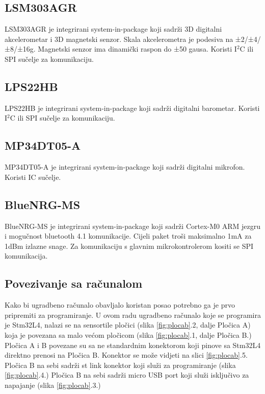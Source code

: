 \documentclass[times, utf8, diplomski]{diplomski}
\begin{document}
\subsection{LSM303AGR}
LSM303AGR je integrirani system-in-package koji sadrži 3D digitalni akcelerometar i 3D magnetski senzor. Skala akcelerometra je podesiva na
±2/±4/±8/±16g. Magnetski senzor ima dinamički raspon do ±50 gausa. Koristi I\(^2\)C ili SPI sučelje za komunikaciju.

\subsection{LPS22HB}
LPS22HB je integrirani system-in-package koji sadrži digitalni barometar. Koristi I\(^2\)C ili SPI sučelje za komunikaciju.

\subsection{MP34DT05-A}
MP34DT05-A je integrirani system-in-package koji sadrži digitalni mikrofon. Koristi IC sučelje.

\subsection{BlueNRG-MS}
BlueNRG-MS\cite{BlueNrgMs} je integrirani system-in-package koji sadrži Cortex-M0 ARM jezgru i mogučnost bluetooth 4.1 komunikacije.
Cijeli paket troši maksimalno 1mA za 1dBm izlazne snage. Za komunikaciju s glavnim mikrokontrolerom kositi se SPI komunikacija.

\subsection{Povezivanje sa računalom}
Kako bi ugradbeno računalo obavljalo koristan posao potrebno ga je prvo pripremiti za programiranje. U ovom radu ugradbeno računalo koje se programira je Stm32L4, nalazi se na sensortile pločici (slika \ref{fig:plocab}.2, dalje Pločica A) koja je povezana sa malo većom pločicom (slika \ref{fig:plocab}.1, dalje Pločica B.) Pločica A i B povezane su sa ne standardnim konektorom koji pinove sa Stm32L4 direktno prenosi na Pločica B. Konektor se može vidjeti na slici \ref{fig:plocab}.5. Pločica B na sebi sadrži st link\cite{stlink} konektor koji služi za programiranje (slika \ref{fig:plocab}.4.) Pločica B na sebi sadrži micro USB port koji služi isključivo za napajanje (slika \ref{fig:plocab}.3.)
\end{document}
